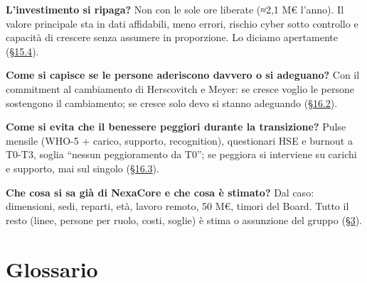 \documentclass[11pt,a4paper]{article}
\begin{document}
\textbf{L'investimento si ripaga?}
Non con le sole ore liberate (≈2,1 M€ l'anno). Il valore principale sta in dati affidabili, meno errori, rischio cyber sotto controllo e capacità di crescere senza assumere in proporzione. Lo diciamo apertamente (\hyperref[sec:15.4]{\S15.4}).

\textbf{Come si capisce se le persone aderiscono davvero o si adeguano?}
Con il commitment al cambiamento di Herscovitch e Meyer: se cresce \guillemotleft{}voglio\guillemotright{} le persone sostengono il cambiamento; se cresce solo \guillemotleft{}devo\guillemotright{} si stanno adeguando (\hyperref[sec:16.2]{\S16.2}).

\textbf{Come si evita che il benessere peggiori durante la transizione?}
Pulse mensile (WHO-5 + carico, supporto, recognition), questionari HSE e burnout a T0-T3, soglia ``nessun peggioramento da T0''; se peggiora si interviene su carichi e supporto, mai sul singolo (\hyperref[sec:16.3]{\S16.3}).

\textbf{Che cosa si sa già di NexaCore e che cosa è stimato?}
Dal caso: dimensioni, sedi, reparti, età, lavoro remoto, 50 M€, timori del Board. Tutto il resto (linee, persone per ruolo, costi, soglie) è stima o assunzione del gruppo (\hyperref[sec:3]{\S3}).

\section{Glossario}\label{sec:21}
\end{document}
